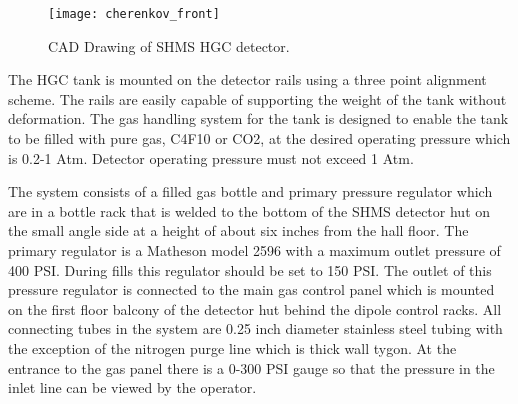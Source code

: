 {%
% 
% 
% 
% 
% 
% 
% 








\begin{figure}[ht]
\centering
\texttt{[image: cherenkov\_front]}
\caption{CAD Drawing of SHMS HGC detector. \label{fig:hgc}}
\end{figure}



The HGC tank is mounted on the detector rails using a three point
alignment scheme. The rails are easily capable of supporting the
weight of the tank without deformation. The gas handling system for
the tank is designed to enable the tank to be filled with pure gas,
C4F10 or CO2, at the desired operating pressure which is 0.2-1
Atm. Detector operating pressure must not exceed 1 Atm.

{ \color{red}  

The system consists of a filled gas bottle and primary pressure
regulator which are in a bottle rack that is welded to the bottom of
the SHMS detector hut on the small angle side at a height of about six
inches from the hall floor. The primary regulator is a Matheson model
2596 with a maximum outlet pressure of 400 PSI.  During fills this
regulator should be set to 150 PSI. The outlet of this pressure
regulator is connected to the main gas control panel which is mounted
on the first floor balcony of the detector hut behind the dipole
control racks. All connecting tubes in the system are 0.25 inch
diameter stainless steel tubing with the exception of the nitrogen
purge line which is thick wall tygon. At the entrance to the gas panel
there is a 0-300 PSI gauge so that the pressure in the inlet line can
be viewed by the operator.


}}
